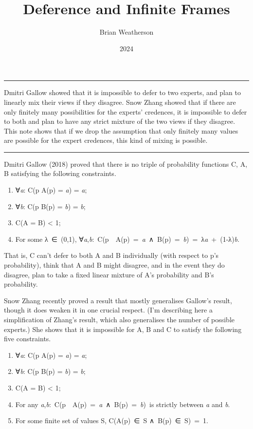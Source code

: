 \documentclass[
  10pt,
  letterpaper,
  DIV=11,
  numbers=noendperiod,
  twoside]{scrartcl}
\title{Deference and Infinite Frames}
\author{Brian Weatherson}
\date{2024}
\providecommand{\tightlist}{%
  \setlength{\itemsep}{0pt}\setlength{\parskip}{0pt}}\usepackage{longtable,booktabs,array}
\renewenvironment{abstract}
 {\vspace{-1.25cm}
 \quotation\small\noindent\rule{\linewidth}{.5pt}\par\smallskip
 \noindent }
 {\par\noindent\rule{\linewidth}{.5pt}\endquotation}
\begin{document}
\maketitle
\begin{abstract}
Dmitri Gallow showed that it is impossible to defer to two experts, and
plan to linearly mix their views if they disagree. Snow Zhang showed
that if there are only finitely many possibilities for the experts'
credences, it is impossible to defer to both and plan to have any strict
mixture of the two views if they disagree. This note shows that if we
drop the assumption that only finitely many values are possible for the
expert credences, this kind of mixing is possible.
\end{abstract}

Dmitri Gallow (2018) proved that there is no triple of probability
functions C, A, B satisfying the following constraints.

\begin{enumerate}
\def\labelenumi{\arabic{enumi}.}
\tightlist
\item
  ∀\emph{a}: C(p \textbar{} A(p) = \emph{a}) = \emph{a};
\item
  ∀\emph{b}: C(p \textbar{} B(p) = \emph{b}) = \emph{b};
\item
  C(A = B) \textless{} 1;
\item
  For some λ~∈~(0,1),
  ∀\emph{a},\emph{b}:~C(p~\textbar~A(p)~=~\emph{a}~∧~B(p)~=~\emph{b})~=~λ\emph{a}~+~(1-λ)\emph{b}.
\end{enumerate}

That is, C can't defer to both A and B individually (with respect to p's
probability), think that A and B might disagree, and in the event they
do disagree, plan to take a fixed linear mixture of A's probability and
B's probability.

Snow Zhang recently proved a result that mostly generalises Gallow's
result, though it does weaken it in one crucial respect. (I'm describing
here a simplification of Zhang's result, which also generalises the
number of possible experts.) She shows that it is impossible for A, B
and C to satisfy the following five constraints.

\begin{enumerate}
\def\labelenumi{\arabic{enumi}.}
\tightlist
\item
  ∀\emph{a}: C(p \textbar{} A(p) = \emph{a}) = \emph{a};
\item
  ∀\emph{b}: C(p \textbar{} B(p) = \emph{b}) = \emph{b};
\item
  C(A = B) \textless{} 1;
\item
  For any
  \emph{a},\emph{b}:~C(p~\textbar~A(p)~=~\emph{a}~∧~B(p)~=~\emph{b})~is
  strictly between \emph{a} and \emph{b}.
\item
  For some finite set of values S, C(A(p)~∈~S ∧~B(p)~∈~S)~=~1.
\end{enumerate}
\end{document}
